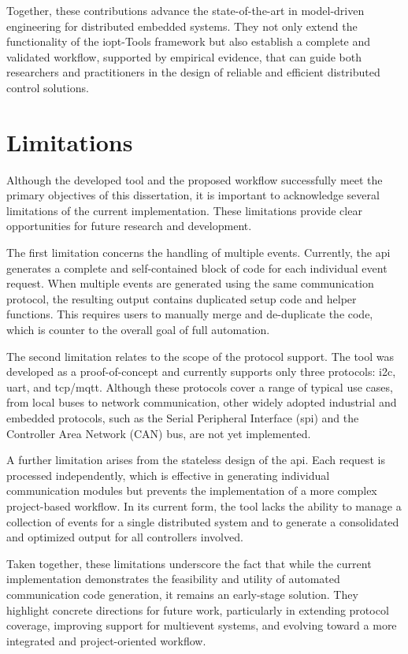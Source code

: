 Together, these contributions advance the state-of-the-art in model-driven engineering for distributed embedded systems. They not only extend the functionality of the \gls{iopt}-Tools framework but also establish a complete and validated workflow, supported by empirical evidence, that can guide both researchers and practitioners in the design of reliable and efficient distributed control solutions.


\section{Limitations}
\label{sec:limitations}

Although the developed tool and the proposed workflow successfully meet the primary objectives of this dissertation, it is important to acknowledge several limitations of the current implementation. These limitations provide clear opportunities for future research and development. 

The first limitation concerns the handling of multiple events. Currently, the \gls{api} generates a complete and self-contained block of code for each individual event request. When multiple events are generated using the same communication protocol, the resulting output contains duplicated setup code and helper functions. This requires users to manually merge and de-duplicate the code, which is counter to the overall goal of full automation.

The second limitation relates to the scope of the protocol support. The tool was developed as a proof-of-concept and currently supports only three protocols: \gls{i2c}, \gls{uart}, and \gls{tcp}/\gls{mqtt}. Although these protocols cover a range of typical use cases, from local buses to network communication, other widely adopted industrial and embedded protocols, such as the Serial Peripheral Interface (\gls{spi}) and the Controller Area Network (CAN) bus, are not yet implemented.

A further limitation arises from the stateless design of the \gls{api}. Each request is processed independently, which is effective in generating individual communication modules but prevents the implementation of a more complex project-based workflow. In its current form, the tool lacks the ability to manage a collection of events for a single distributed system and to generate a consolidated and optimized output for all controllers involved.

Taken together, these limitations underscore the fact that while the current implementation demonstrates the feasibility and utility of automated communication code generation, it remains an early-stage solution. They highlight concrete directions for future work, particularly in extending protocol coverage, improving support for multievent systems, and evolving toward a more integrated and project-oriented workflow.



